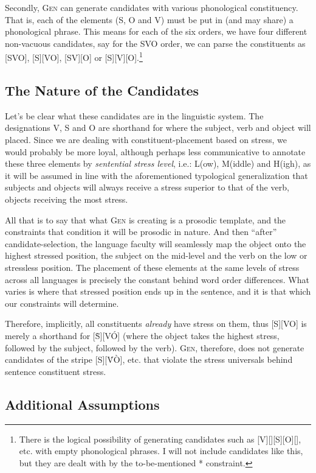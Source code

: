 \documentclass{article}
\newcommand{\nophi}{\textsc{*\textphi}}
\begin{document}
Secondly, \textsc{Gen} can generate candidates with various phonological constituency.
That is, each of the elements (S, O and V) must be put in (and may share) a phonological phrase.
This means for each of the six orders, we have four different non-vacuous candidates, say for the SVO order, we can parse the constituents as [SVO], [S][VO], [SV][O] or [S][V][O].\footnote{There is the logical possibility of generating candidates such as [V][][S][O][], etc. with empty phonological phrases. I will not include candidates like this, but they are dealt with by the to-be-mentioned {\nophi} constraint.}

\subsection{The Nature of the Candidates}

Let's be clear what these candidates are in the linguistic system.
The designations V, S and O are shorthand for where the subject, verb and object will placed.
Since we are dealing with constituent-placement based on stress, we would probably be more loyal, although perhaps less communicative to annotate these three elements by \emph{sentential stress level}, i.e.: L(ow), M(iddle) and H(igh), as it will be assumed in line with the aforementioned typological generalization that subjects and objects will always receive a stress superior to that of the verb, objects receiving the most stress.

All that is to say that what \textsc{Gen} is creating is a prosodic template, and the constraints that condition it will be prosodic in nature.
And then ``after'' candidate-selection, the language faculty will seamlessly map the object onto the highest stressed position, the subject on the mid-level and the verb on the low or stressless position.
The placement of these elements at the same levels of stress across all languages is precisely the constant behind word order differences.
What varies is where that stressed position ends up in the sentence, and it is that which our constraints will determine.

Therefore, implicitly, all constituents \emph{already} have stress on them, thus [S][VO] is merely a shorthand for [{\`S}][V\'O] (where the object takes the highest stress, followed by the subject, followed by the verb).
\textsc{Gen}, therefore, does not generate candidates of the stripe [S][\'V\`O], etc. that violate the stress universals behind sentence constituent stress.

\subsection{Additional Assumptions\label{assump}}
\end{document}
